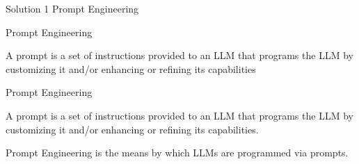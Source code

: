 \documentclass[t]{beamer}
\begin{document}
\begin{frame}{Solution 1}
  \vspace{5cm}
  \centering
  Prompt Engineering 
\end{frame}

\begin{frame}{Prompt Engineering}
  \vspace{1cm}
  \begin{definition}{A prompt}
    is a set of instructions provided to an LLM that programs the LLM by customizing it and/or enhancing or refining its capabilities  
  \end{definition}
\end{frame}
\begin{frame}{Prompt Engineering}
  \vspace{1cm}
  \begin{definition}{A prompt}
    is a set of instructions provided to an LLM that programs the LLM by customizing it and/or enhancing or refining its capabilities. \cite{LiuPengfei23}   
  \end{definition}
  \vspace{1cm}
  \begin{definition}{Prompt Engineering}
    is the means by which LLMs are programmed via prompts. \cite{LiuPengfei23}  
  \end{definition}
\end{frame}
\end{document}
